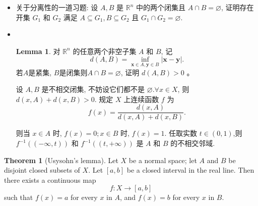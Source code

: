 \documentclass{beamer}
\theoremstyle{definition}
\newtheorem{theo}[defn]{Theorem}
\newtheorem{lem}[defn]{Lemma}
\newenvironment{prooff}{{\noindent\it\textcolor{cyan!40!black}{Proof}:}\,}{\par}
\begin{document}
\begin{frame}
    \begin{itemize}
        \item 关于分离性的一道习题: 设 $A,B$ 是 $\mathbb{R}^n$ 中的两个闭集且 $A \cap B=\varnothing$, 证明存在开集 $G_1$ 和 $G_2$ 满足 $A \subseteq G_1, B \subseteq G_2$ 且 $G_1 \cap G_2=\varnothing$.
              \pause
        \item   \begin{prooff}
                  \begin{lem}
                      对 $\mathbb{R}^n$ 的任意两个非空子集 $A$ 和 $B$, 记
                      $$
                          d(A, B)=\inf _{\boldsymbol{x} \in A, \boldsymbol{y} \in B}|\boldsymbol{x}-\boldsymbol{y}| .
                      $$
                      若$A$是紧集, $B$是闭集则$A\cap B=\varnothing$, 证明 $d(A, B)>0$ 。
                  \end{lem}
                  设 $A, B$ 是不相交闭集, 不妨设它们都不是 $\varnothing . \forall x \in X$, 则 $d(x, A)+d(x, B)>0$. 规定 $X$ 上连续函数 $f$ 为
                  $$
                      f(x)=\frac{d(x, A)}{d(x, A)+d(x, B)} .
                  $$

                  则当 $x \in A$ 时, $f(x)=0 ; x \in B$ 时, $f(x)=1$. 任取实数 $t \in(0,1)$,则 $f^{-1}((-\infty, t))$ 和 $f^{-1}((t,+\infty))$ 是 $A$ 和 $B$ 的不相交邻域.
              \end{prooff}
    \end{itemize}
\end{frame}


\begin{frame}
    \begin{theo}[Usysohn's lemma]
        Let $X$ be a normal space; let $A$ and $B$ be disjoint closed subsets of $X$. Let $[a, b]$ be a closed interval in the real line. Then there exists a continuous map
        $$
            f: X \longrightarrow[a, b]
        $$
        such that $f(x)=a$ for every $x$ in $A$, and $f(x)=b$ for every $x$ in $B$.
    \end{theo}

\end{frame}
\end{document}
